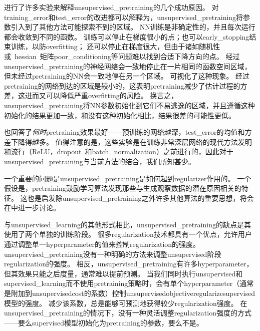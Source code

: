 \cite{Erhan+al-2010-small}进行了许多实验来解释\gls{unsupervised_pretraining}的几个成功原因。
对\gls{training_error}和\gls{test_error}的改进都可以解释为，\gls{unsupervised_pretraining}将参数引入到了其他方法可能探索不到的区域。
\gls{NN}训练是非确定性的，并且每次运行都会收敛到不同的函数。
训练可以停止在梯度很小的点；也可以\gls{early_stopping}结束训练，以防\gls{overfitting}；
还可以停止在梯度很大，但由于诸如随机性或~\gls{hessian}~矩阵\gls{poor_conditioning}等问题难以找到合适下降方向的点。
经过\gls{unsupervised_pretraining}的神经网络会一致地停止在一片相同的函数空间区域，但未经过\gls{pretraining}的\gls{NN}会一致地停在另一个区域。
可视化了这种现象。
经过\gls{pretraining}的网络到达的区域是较小的，这表明\gls{pretraining}减少了估计过程的方差，这进而又可以降低严重\gls{overfitting}的风险。
换言之，\gls{unsupervised_pretraining}将\gls{NN}参数初始化到它们不易逃逸的区域，并且遵循这种初始化的结果更加一致，和没有这种初始化相比，结果很差的可能性更低。


\cite{Erhan+al-2010-small}也回答了\emph{何时}\gls{pretraining}效果最好——预训练的网络越深，\gls{test_error}的均值和方差下降得越多。
值得注意的是，这些实验是在训练非常深层网络的现代方法发明和流行（\gls{ReLU}，\gls{dropout}~和\gls{batch_normalization}）之前进行的，因此对于\gls{unsupervised_pretraining}与当前方法的结合，我们所知甚少。



一个重要的问题是\gls{unsupervised_pretraining}是如何起到\gls{regularizer}作用的。
一个假设是，\gls{pretraining}鼓励学习算法发现那些与生成观察数据的潜在原因相关的特征。
这也是启发除\gls{unsupervised_pretraining}之外许多其他算法的重要思想，将会在中进一步讨论。



与\gls{unsupervised_learning}的其他形式相比，\gls{unsupervised_pretraining}的缺点是其使用了两个单独的训练阶段。
很多\gls{regularization}技术都具有一个优点，允许用户通过调整单一\gls{hyperparameter}的值来控制\gls{regularization}的强度。
\gls{unsupervised_pretraining}没有一种明确的方法来调整\gls{unsupervised}阶段\gls{regularization}的强度。
相反，\gls{unsupervised_pretraining}有许多\gls{hyperparameter}，但其效果只能之后度量，通常难以提前预测。
当我们同时执行\gls{unsupervised}和\gls{supervised_learning}而不使用\gls{pretraining}策略时，会有单个\gls{hyperparameter}（通常是附加到\gls{unsupervised}\gls{cost}的系数）控制\gls{unsupervised}\gls{objective}\gls{regularize}\gls{supervised}模型的强度。
减少该系数，总是能够可预测地获得较少\gls{regularization}强度。
在\gls{unsupervised_pretraining}的情况下，没有一种灵活调整\gls{regularization}强度的方式——要么\gls{supervised}模型初始化为\gls{pretraining}的参数，要么不是。


